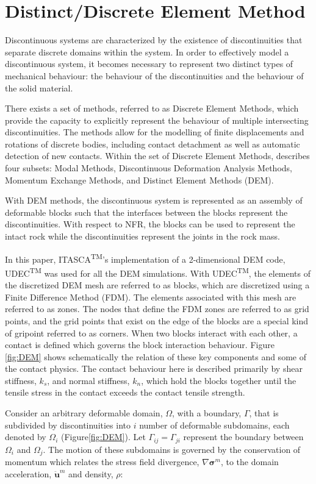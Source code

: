 \section{Distinct/Discrete Element Method}
Discontinuous systems are characterized by the existence of discontinuities that separate discrete domains within the system. In order to effectively model a discontinuous system, it becomes necessary to represent two distinct types of mechanical behaviour: the behaviour of the discontinuities and the behaviour of the solid material.

There exists a set of methods, referred to as Discrete Element Methods, which provide the capacity to explicitly represent the behaviour of multiple intersecting discontinuities. The methods allow for the modelling of finite displacements and rotations of discrete bodies, including contact detachment as well as automatic detection of new contacts. Within the set of Discrete Element Methods, \citet{CUNDALL_1992} describes four subsets: Modal Methods, Discontinuous Deformation Analysis Methods, Momentum Exchange Methods, and Distinct Element Methods (DEM).


With DEM methods, the discontinuous system is represented as an assembly of deformable blocks such that the interfaces between the blocks represent the discontinuities. With respect to NFR, the blocks can be used to represent the intact rock while the discontinuities represent the joints in the rock mass. 

In this paper, ITASCA\textsuperscript{TM}'s implementation of a 2-dimensional DEM code, UDEC\textsuperscript{TM} was used for all the DEM simulations. With UDEC\textsuperscript{TM}, the elements of the discretized DEM mesh are referred to as blocks, which are discretized using a Finite Difference Method (FDM). The elements associated with this mesh are referred to as zones. The nodes that define the FDM zones are referred to as grid points, and the grid points that exist on the edge of the blocks are a special kind of gripoint referred to as corners. When two blocks interact with each other, a contact is defined which governs the block interaction behaviour.  Figure \ref{fig:DEM} shows schematically the relation of these key components and some of the contact physics. The contact behaviour here is described primarily by shear stiffness, $k_s$, and normal stiffness, $k_n$, which hold the blocks together until the tensile stress in the contact exceeds the contact tensile strength. 

Consider an arbitrary deformable domain, $\Omega$, with a boundary, $\Gamma$, that is subdivided by discontinuities into $i$ number of deformable subdomains, each denoted by $\Omega_i$ (Figure\ref{fig:DEM}). Let $\Gamma_{ij}=\Gamma_{ji}$ represent the boundary between $\Omega_i$ and $\Omega_j$. The motion of these subdomains is governed by the conservation of momentum which relates the stress field divergence, $\nabla\boldsymbol{\sigma}^m$, to the domain acceleration, $\ddot{\mathbf{u}}^m$ and density, $\rho$:
